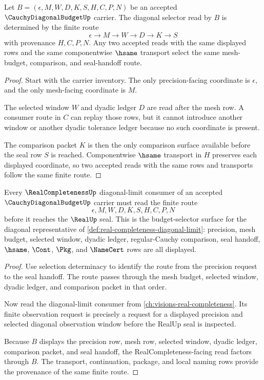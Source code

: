 \begin{theorem}
\label{thm:cauchy-diagonal-budget-selection-determinacy}
Let $B=(\epsilon,M,W,D,K,S,H,C,P,N)$ be an accepted $\CauchyDiagonalBudgetUp$ carrier. The diagonal selector read by $B$ is determined by the finite route
$$
\epsilon \to M \to W \to D \to K \to S
$$
with provenance $H,C,P,N$. Any two accepted reads with the same displayed rows and the same componentwise $\hsame$ transport select the same mesh-budget, comparison, and seal-handoff route.
\end{theorem}
\begin{proof}
Start with the carrier inventory. The only precision-facing coordinate is $\epsilon$, and the only mesh-facing coordinate is $M$.

The selected window $W$ and dyadic ledger $D$ are read after the mesh row. A consumer route in $C$ can replay those rows, but it cannot introduce another window or another dyadic tolerance ledger because no such coordinate is present.

The comparison packet $K$ is then the only comparison surface available before the seal row $S$ is reached. Componentwise $\hsame$ transport in $H$ preserves each displayed coordinate, so two accepted reads with the same rows and transports follow the same finite route.
\end{proof}

\begin{theorem}
\label{thm:cauchy-diagonal-budget-real-completeness-handoff}
Every $\RealCompletenessUp$ diagonal-limit consumer of an accepted $\CauchyDiagonalBudgetUp$ carrier must read the finite route
$$
\epsilon,M,W,D,K,S,H,C,P,N
$$
before it reaches the $\RealUp$ seal. This is the budget-selector surface for the diagonal representative of \autoref{def:real-completeness-diagonal-limit}: precision, mesh budget, selected window, dyadic ledger, regular-Cauchy comparison, seal handoff, $\hsame$, $\Cont$, $\Pkg$, and $\NameCert$ rows are all displayed.
\end{theorem}
\begin{proof}
Use selection determinacy to identify the route from the precision request to the seal handoff. The route passes through the mesh budget, selected window, dyadic ledger, and comparison packet in that order.

Now read the diagonal-limit consumer from \autoref{ch:visions-real-completeness}. Its finite observation request is precisely a request for a displayed precision and selected diagonal observation window before the RealUp seal is inspected.

Because $B$ displays the precision row, mesh row, selected window, dyadic ledger, comparison packet, and seal handoff, the RealCompleteness-facing read factors through $B$. The transport, continuation, package, and local naming rows provide the provenance of the same finite route.
\end{proof}

